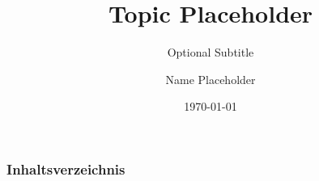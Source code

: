 \documentclass[ngerman]{beamer}
\title{Topic Placeholder}
\subtitle{Optional Subtitle}
\author{Name Placeholder}
\date{\today}
\begin{document}
    \begin{frame}
        \titlepage
    \end{frame}
    \begin{frame}
        \frametitle{Inhaltsverzeichnis}
        \tableofcontents
    \end{frame}

    
    

    
\end{document}

